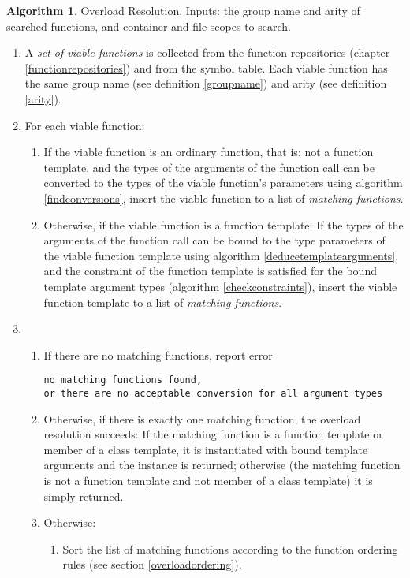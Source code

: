 \documentclass[a4paper,oneside,11pt]{book}
\theoremstyle{definition}
\newtheorem{algo}{Algorithm}[section]
\begin{document}
\begin{algo} Overload Resolution. Inputs: the group name and arity of searched functions, and container and file scopes to search.
\begin{enumerate}
\item
A \emph{set of viable functions} is collected from the function repositories (chapter \ref{functionrepositories}) and from the symbol table.
Each viable function has the same group name (see definition \ref{groupname}) and arity (see definition \ref{arity}).
\item
For each viable function:
\begin{enumerate}
\item
If the viable function is an ordinary function, that is: not a function template,
and the types of the arguments of the function call can be converted to the types of the viable function's parameters using algorithm \ref{findconversions},
insert the viable function to a list of \emph{matching functions}.
\item
Otherwise, if the viable function is a function template:
If the types of the arguments of the function call can be bound to the type parameters of the viable function template using
algorithm \ref{deducetemplatearguments}, and
the constraint of the function template is satisfied for the bound template argument types (algorithm \ref{checkconstraints}),
insert the viable function template to a list of \emph{matching functions}.
\end{enumerate}
\item
\begin{enumerate}
\item
If there are no matching functions, report error\\
\begin{verbatim}
no matching functions found,
or there are no acceptable conversion for all argument types
\end{verbatim}
\item
Otherwise, if there is exactly one matching function, the overload resolution succeeds:
If the matching function is a function template or member of a class template, it is instantiated with bound template arguments and the instance is returned;
otherwise (the matching function is not a function template and not member of a class template) it is simply returned.
\item
Otherwise:
\begin{enumerate}
\item
Sort the list of matching functions according to the function ordering rules (see section \ref{overloadordering}).

\end{enumerate}
\end{enumerate}
\end{enumerate}
\end{algo}
\end{document}
